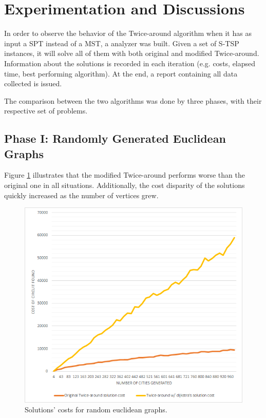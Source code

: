 \documentclass[journal]{IEEEtran}
\begin{document}
\section{Experimentation and Discussions}

In order to observe the behavior of the Twice-around algorithm when it has as input a SPT instead of a MST, a analyzer was built. Given a set of S-TSP instances, it will solve all of them with both original and modified Twice-around. Information about the solutions is recorded in each iteration (e.g. costs, elapsed time, best performing algorithm). At the end, a report containing all data collected is issued.

The comparison between the two algorithms was done by three phases, with their respective set of problems.

\subsection{Phase I: Randomly Generated Euclidean Graphs}

Figure \ref{fig:ctreg} illustrates that the modified Twice-around performs worse than the original one in all situations. Additionally, the cost disparity of the solutions quickly increased as the number of vertices grew.

\begin{figure}[H]
	\centering
	\includegraphics[width=.95\linewidth]{comparison-ta-random-euclidean-graphs}
	\caption{Solutions' costs for random euclidean graphs.}
	\label{fig:ctreg}
\end{figure}
\end{document}
